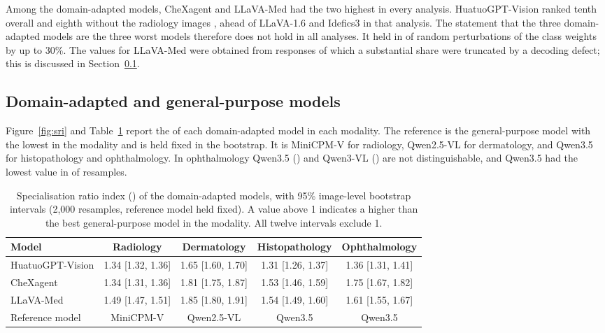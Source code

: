 Among the domain-adapted models, CheXagent and LLaVA-Med had the two highest \SMHR{} in every analysis. HuatuoGPT-Vision ranked tenth overall and eighth without the radiology images \rad{}, ahead of LLaVA-1.6 and Idefics3 in that analysis. The statement that the three domain-adapted models are the three worst models therefore does not hold in all analyses. It held in  of random perturbations of the class weights by up to 30\%. The values for LLaVA-Med were obtained from responses of which a substantial share were truncated by a decoding defect; this is discussed in Section~\ref{subsec:res_sri}.

\subsection{Domain-adapted and general-purpose models}
\label{subsec:res_sri}

Figure~\ref{fig:sri} and Table~\ref{tab:sri} report the \SRI{} of each domain-adapted model in each modality. The reference is the general-purpose model with the lowest \SMHR{} in the modality and is held fixed in the bootstrap. It is MiniCPM-V for radiology, Qwen2.5-VL for dermatology, and Qwen3.5 for histopathology and ophthalmology. In ophthalmology Qwen3.5 () and Qwen3-VL () are not distinguishable, and Qwen3.5 had the lowest value in  of resamples.

\begin{table}[t]
\centering
\small
\caption{Specialisation ratio index (\SRI) of the domain-adapted models, with 95\% image-level bootstrap intervals (2,000 resamples, reference model held fixed). A value above 1 indicates a higher \SMHR{} than the best general-purpose model in the modality. All twelve intervals exclude 1.}
\label{tab:sri}
\begin{tabular}{@{}lcccc@{}}
\toprule
Model & Radiology \rad{} & Dermatology & Histopathology & Ophthalmology \\
\midrule
HuatuoGPT-Vision & 1.34 [1.32, 1.36] & 1.65 [1.60, 1.70] & 1.31 [1.26, 1.37] & 1.36 [1.31, 1.41] \\
CheXagent & 1.34 [1.31, 1.36] & 1.81 [1.75, 1.87] & 1.53 [1.46, 1.59] & 1.75 [1.67, 1.82] \\
LLaVA-Med & 1.49 [1.47, 1.51] & 1.85 [1.80, 1.91] & 1.54 [1.49, 1.60] & 1.61 [1.55, 1.67] \\
\midrule
Reference model & MiniCPM-V & Qwen2.5-VL & Qwen3.5 & Qwen3.5 \\
\bottomrule
\end{tabular}
\end{table}

